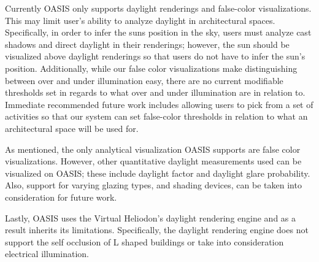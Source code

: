 
		Currently OASIS only supports daylight renderings and false-color visualizations. This may limit user's ability to analyze daylight in architectural spaces. Specifically, in order to infer the suns position in the sky, users must analyze cast shadows and  direct daylight in their renderings; however, the sun should be visualized above daylight renderings so that users do not have to infer the sun's position. Additionally, while our false color visualizations make distinguishing between over and under illumination easy, there are no current modifiable thresholds set in regards to what over and under illumination are in relation to. Immediate recommended future work includes allowing users to pick from a set of activities so that our system can set false-color thresholds in relation to what an architectural space will be used for.



   		As mentioned, the only analytical visualization OASIS supports are false color visualizations. However, other quantitative daylight measurements used can be visualized on OASIS; these include daylight factor and daylight glare probability. Also, support for varying glazing types, and shading devices, can be taken into consideration for future work.


	    Lastly, OASIS uses the Virtual Heliodon's daylight rendering engine and as a result inherits its limitations. Specifically, the daylight rendering engine does not support the self occlusion of L shaped buildings or take into consideration electrical illumination.



